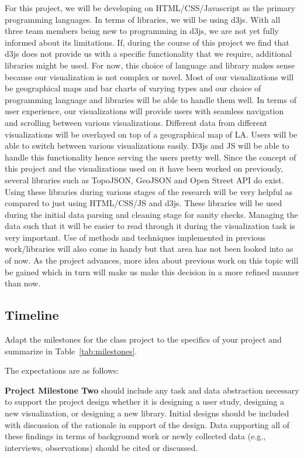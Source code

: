 For this project, we will be developing on HTML/CSS/Javascript as the primary programming languages. In terms of libraries, we will be using d3js. With all three team members being new to programming in d3js, we are not yet fully informed about its limitations. If, during the course of this project we find that d3js does not provide us with a specific functionality that we require, additional libraries might be used. For now, this choice of language and library makes sense because our visualization is not complex or novel. Most of our visualizations will be geographical maps and bar charts of varying types and our choice of programming language and libraries will be able to handle them well. 
In terms of user experience, our visualizations will provide users with seamless navigation and scrolling between various visualizations. Different data from different visualizations will be overlayed on top of a geographical map of LA. Users will be able to switch between various visualizations easily. D3js and JS will be able to handle this functionality hence serving the users pretty well. 
Since the concept of this project and the visualizations used on it have been worked on previously, several libraries such as TopoJSON, GeoJSON and Open Street API do exist. Using these libraries during various stages of the research will be very helpful as compared to just using HTML/CSS/JS and d3js. These libraries will be used during the initial data parsing and cleaning stage for sanity checks. Managing the data such that it will be easier to read through it during the visualization task is very important. Use of methods and techniques implemented in previous work/libraries will also come in handy but that area has not been looked into as of now. As the project advances, more idea about previous work on this topic will be gained which in turn will make us make this decision in a more refined manner than now.

\subsection{Timeline}
\label{sec:timeline}

Adapt the milestones for the class project to the specifics of your project
and summarize in Table~\ref{tab:milestones}.

The expectations are as follows:

\vspace{1.5ex}\noindent\textbf{Project Milestone Two} should include any task
and data abstraction necessary to support the project design whether it is
designing a user study, designing a new visualization, or designing a new
library. Initial designs should be included with discussion of the rationale
in support of the design. Data supporting all of these findings in terms of
background work or newly collected data (e.g., interviews, observations)
should be cited or discussed. 


